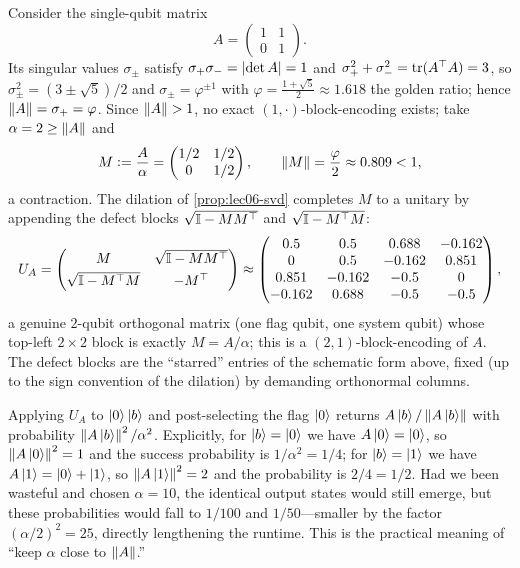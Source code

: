 \begin{example}
\label{exa:lec06-2x2}
Consider the single-qubit matrix
\[
  A=\begin{pmatrix} 1 & 1\\ 0 & 1\end{pmatrix}.
\]
Its singular values $\sigma_\pm$ satisfy $\sigma_+\sigma_-=\left\lvert \det A \right\rvert=1$ and
$\sigma_+^2+\sigma_-^2=\operatorname{tr}(A^\top A)=3$, so $\sigma_\pm^2=(3\pm\sqrt5)/2$ and
$\sigma_\pm=\varphi^{\pm1}$ with $\varphi=\tfrac{1+\sqrt5}{2}\approx1.618$ the golden
ratio; hence $\left\lVert A \right\rVert=\sigma_+=\varphi$. Since $\left\lVert A \right\rVert>1$, no exact
$(1,\cdot)$-block-encoding exists; take $\alpha=2\ge\left\lVert A \right\rVert$ and
\[
  M\vcentcolon=\frac{A}{\alpha}=\begin{pmatrix}1/2&1/2\\0&1/2\end{pmatrix},
  \qquad \left\lVert M \right\rVert=\frac{\varphi}{2}\approx0.809<1 ,
\]
a contraction. The dilation of \cref{prop:lec06-svd} completes $M$ to a unitary by
appending the defect blocks $\sqrt{\mathbb{I}-MM^\top}$ and $\sqrt{\mathbb{I}-M^\top M}$:
\[
  U_A=\begin{pmatrix} M & \sqrt{\mathbb{I}-MM^\top}\\[3pt]
                      \sqrt{\mathbb{I}-M^\top M} & -M^\top\end{pmatrix}
     \approx\begin{pmatrix}
        0.5 & 0.5 & 0.688 & -0.162\\
        0   & 0.5 & -0.162 & 0.851\\
        0.851 & -0.162 & -0.5 & 0\\
        -0.162 & 0.688 & -0.5 & -0.5
      \end{pmatrix},
\]
a genuine $2$-qubit orthogonal matrix (one flag qubit, one system qubit) whose
top-left $2\times2$ block is exactly $M=A/\alpha$; this is a $(2,1)$-block-encoding of
$A$. The defect blocks are the ``starred'' entries of the schematic form above, fixed
(up to the sign convention of the dilation) by demanding orthonormal columns.

Applying $U_A$ to $\ket{0}\ket{b}$ and post-selecting the flag $\ket{0}$ returns
$A\ket{b}/\left\lVert A\ket{b} \right\rVert$ with probability $\left\lVert A\ket{b} \right\rVert^2/\alpha^2$. Explicitly,
for $\ket{b}=\ket{0}$ we have $A\ket{0}=\ket{0}$, so $\left\lVert A\ket{0} \right\rVert^2=1$ and the
success probability is $1/\alpha^2=1/4$; for $\ket{b}=\ket{1}$ we have
$A\ket{1}=\ket{0}+\ket{1}$, so $\left\lVert A\ket{1} \right\rVert^2=2$ and the probability is
$2/4=1/2$. Had we been wasteful and chosen $\alpha=10$, the identical output states
would still emerge, but these probabilities would fall to $1/100$ and $1/50$---smaller
by the factor $(\alpha/2)^2=25$, directly lengthening the runtime. This is the
practical meaning of ``keep $\alpha$ close to $\left\lVert A \right\rVert$.''
\end{example}

